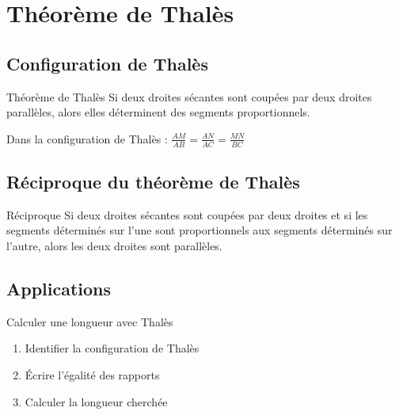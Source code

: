 \chapter{Théorème de Thalès}

\section{Configuration de Thalès}
\begin{propriete}{Théorème de Thalès}
Si deux droites sécantes sont coupées par deux droites parallèles, alors elles déterminent des segments proportionnels.
\end{propriete}

\begin{exemple}
Dans la configuration de Thalès :
$\frac{AM}{AB} = \frac{AN}{AC} = \frac{MN}{BC}$
\end{exemple}

\section{Réciproque du théorème de Thalès}
\begin{propriete}{Réciproque}
Si deux droites sécantes sont coupées par deux droites et si les segments déterminés sur l'une sont proportionnels aux segments déterminés sur l'autre, alors les deux droites sont parallèles.
\end{propriete}

\section{Applications}
\begin{methode}{Calculer une longueur avec Thalès}
\begin{enumerate}
    \item Identifier la configuration de Thalès
    \item Écrire l'égalité des rapports
    \item Calculer la longueur cherchée
\end{enumerate}
\end{methode} 